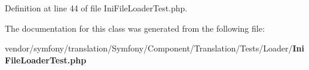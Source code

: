 Definition at line 44 of file Ini\+File\+Loader\+Test.\+php.



The documentation for this class was generated from the following file\+:\begin{DoxyCompactItemize}
\item 
vendor/symfony/translation/\+Symfony/\+Component/\+Translation/\+Tests/\+Loader/{\bf Ini\+File\+Loader\+Test.\+php}\end{DoxyCompactItemize}
